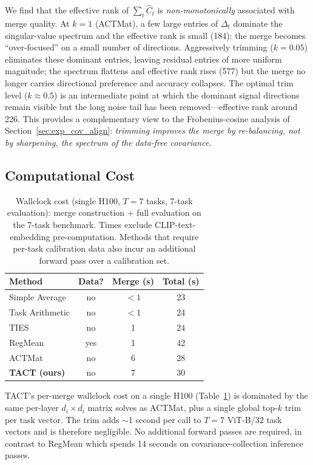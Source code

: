 \documentclass{article}
\theoremstyle{plain}
\theoremstyle{definition}
\theoremstyle{remark}
\begin{document}
We find that the effective rank of $\sum_t \hat C_t$ is \emph{non-monotonically} associated with merge quality. At $k=1$ (ACTMat), a few large entries of $\Delta_t$ dominate the singular-value spectrum and the effective rank is small (184): the merge becomes ``over-focused'' on a small number of directions. Aggressively trimming ($k=0.05$) eliminates these dominant entries, leaving residual entries of more uniform magnitude; the spectrum flattens and effective rank rises (577) but the merge no longer carries directional preference and accuracy collapses. The optimal trim level ($k\approx 0.5$) is an intermediate point at which the dominant signal directions remain visible but the long noise tail has been removed---effective rank around 226. This provides a complementary view to the Frobenius-cosine analysis of Section~\ref{sec:exp_cov_align}: \emph{trimming improves the merge by re-balancing, not by sharpening, the spectrum of the data-free covariance.}

\subsection{Computational Cost}
\label{sec:exp_cost}

\begin{table}[h]
\caption{Wallclock cost (single H100, $T=7$ tasks, 7-task evaluation): merge construction + full evaluation on the 7-task benchmark. Times exclude CLIP-text-embedding pre-computation. Methods that require per-task calibration data also incur an additional forward pass over a calibration set.}
\label{tab:cost}
\centering
\small
\begin{tabular}{lccc}
\toprule
Method & Data? & Merge (s) & Total (s) \\
\midrule
Simple Average      & no  & $<1$  & 23 \\
Task Arithmetic     & no  & $<1$  & 24 \\
TIES                & no  & 1     & 24 \\
RegMean             & yes & 1     & 42 \\
ACTMat              & no  & 6     & 28 \\
\textbf{TACT (ours)} & no  & 7     & 30 \\
\bottomrule
\end{tabular}
\end{table}

TACT's per-merge wallclock cost on a single H100 (Table~\ref{tab:cost}) is dominated by the same per-layer $d_i \times d_i$ matrix solves as ACTMat, plus a single global top-$k$ trim per task vector. The trim adds $\sim$1 second per call to $T=7$ ViT-B/32 task vectors and is therefore negligible. No additional forward passes are required, in contrast to RegMean which spends 14 seconds on covariance-collection inference passes.
\end{document}
